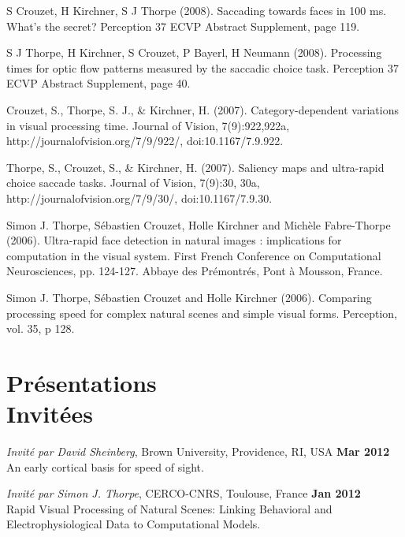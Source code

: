 \documentclass[margin,line]{resume}
\begin{document}
\begin{resume}
	\vspace{-2mm} S Crouzet, H Kirchner, S J Thorpe (2008). Saccading towards faces in 100 ms. What's the secret? Perception 37 ECVP Abstract Supplement, page 119. 

	\vspace{-2mm} S J Thorpe, H Kirchner, S Crouzet, P Bayerl, H Neumann (2008). Processing times for optic flow patterns measured by the saccadic choice task. Perception 37 ECVP Abstract Supplement, page 40.

	\vspace{-2mm} Crouzet, S., Thorpe, S. J., \& Kirchner, H. (2007). Category-dependent variations in visual processing time. Journal of Vision, 7(9):922,922a, http://journalofvision.org/7/9/922/, doi:10.1167/7.9.922.

	\vspace{-2mm} Thorpe, S., Crouzet, S., \& Kirchner, H. (2007). Saliency maps and ultra-rapid choice saccade tasks. Journal of Vision, 7(9):30, 30a, http://journalofvision.org/7/9/30/, doi:10.1167/7.9.30.

	\vspace{-2mm} Simon J. Thorpe, Sébastien Crouzet, Holle Kirchner and Michèle Fabre-Thorpe (2006). Ultra-rapid face detection in natural images : implications for computation in the visual system. First French Conference on Computational Neurosciences, pp. 124-127. Abbaye des Prémontrés, Pont à Mousson, France.

	\vspace{-2mm} Simon J. Thorpe, Sébastien Crouzet and Holle Kirchner (2006). Comparing processing speed for complex natural scenes and simple visual forms. Perception, vol. 35, p 128.

	\normalsize



	
\section{\mysidestyle Présentations\\Invitées}
    
	\footnotesize

	\textit{Invité par David Sheinberg}, Brown University, Providence, RI, USA \hfill \textbf{Mar 2012}\\
	An early cortical basis for speed of sight. 

	\vspace{-2mm} 
	\textit{Invité par Simon J. Thorpe}, CERCO-CNRS, Toulouse, France \hfill \textbf{Jan 2012}\\
	Rapid Visual Processing of Natural Scenes: Linking Behavioral and Electrophysiological Data to Computational Models.


\end{resume}
\end{document}
